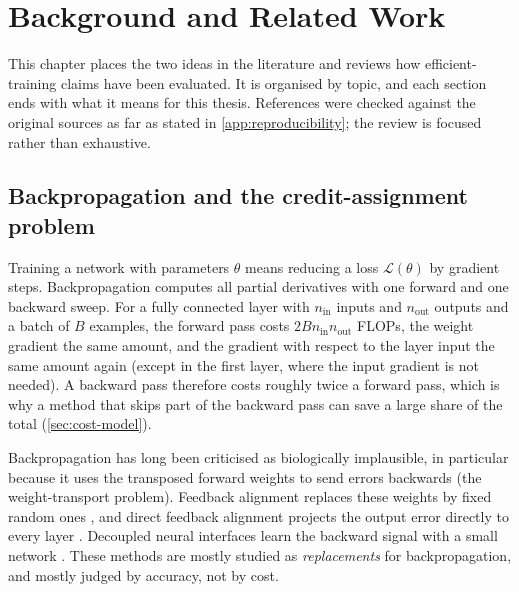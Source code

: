 \chapter{Background and Related Work}\label{ch:background}

This chapter places the two ideas in the literature and reviews how efficient-training claims have been evaluated. It is organised by topic, and each section ends with what it means for this thesis. References were checked against the original sources as far as stated in \cref{app:reproducibility}; the review is focused rather than exhaustive.

\section{Backpropagation and the credit-assignment problem}
Training a network with parameters $\theta$ means reducing a loss $\mathcal{L}(\theta)$ by gradient steps. Backpropagation \citep{rumelhart1986learning} computes all partial derivatives with one forward and one backward sweep. For a fully connected layer with $n_{\mathrm{in}}$ inputs and $n_{\mathrm{out}}$ outputs and a batch of $B$ examples, the forward pass costs $2Bn_{\mathrm{in}}n_{\mathrm{out}}$ FLOPs, the weight gradient the same amount, and the gradient with respect to the layer input the same amount again (except in the first layer, where the input gradient is not needed). A backward pass therefore costs roughly twice a forward pass, which is why a method that skips part of the backward pass can save a large share of the total (\cref{sec:cost-model}).

Backpropagation has long been criticised as biologically implausible, in particular because it uses the transposed forward weights to send errors backwards (the weight-transport problem). Feedback alignment replaces these weights by fixed random ones \citep{lillicrap2016random}, and direct feedback alignment projects the output error directly to every layer \citep{nokland2016direct}. Decoupled neural interfaces learn the backward signal with a small network \citep{jaderberg2017decoupled}. These methods are mostly studied as \emph{replacements} for backpropagation, and mostly judged by accuracy, not by cost.

